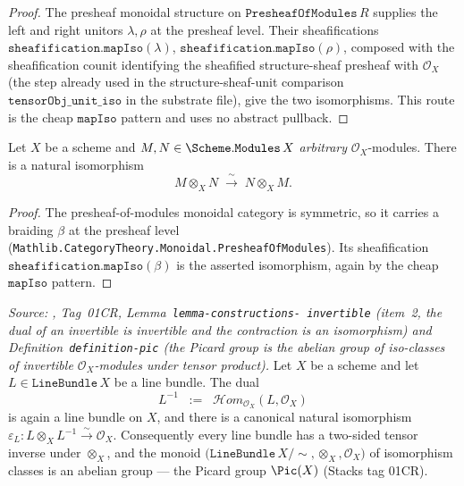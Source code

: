 \begin{proof}
  \leanok
  The presheaf monoidal structure on \(\mathtt{PresheafOfModules}\,R\) supplies
  the left and right unitors \(\lambda, \rho\) at the presheaf level. Their
  sheafifications \(\mathtt{sheafification.mapIso}(\lambda)\),
  \(\mathtt{sheafification.mapIso}(\rho)\), composed with the sheafification
  counit identifying the sheafified structure-sheaf presheaf with
  \(\mathcal{O}_X\) (the step already used in the structure-sheaf-unit
  comparison \(\mathtt{tensorObj\_unit\_iso}\) in the substrate file), give the
  two isomorphisms. This route is the cheap \(\mathtt{mapIso}\) pattern and uses no
  abstract pullback.
\end{proof}

\begin{lemma}\label{mk-lem:tensorobj_comm_iso}
  \leanok

  Let \(X\) be a scheme and \(M, N \in \Scheme.\mathtt{Modules}\,X\)
  \emph{arbitrary} \(\mathcal{O}_X\)-modules. There is a natural isomorphism
  \[
    M \otimes_X N \;\xrightarrow{\ \sim\ }\; N \otimes_X M .
  \]
\end{lemma}

\begin{proof}
  \leanok
  The presheaf-of-modules monoidal category is symmetric, so it carries a
  braiding \(\beta\) at the presheaf level
  (\texttt{Mathlib.CategoryTheory.Monoidal.PresheafOfModules}). Its
  sheafification \(\mathtt{sheafification.mapIso}(\beta)\) is the asserted
  isomorphism, again by the cheap \(\mathtt{mapIso}\) pattern.
\end{proof}

\begin{lemma}\label{mk-lem:tensorobj_inverse_invertible}

  \textit{Source: \cite{stacks-project}, Tag~01CR, Lemma~\texttt{lemma-constructions-%
  invertible} (item~2, the dual of an invertible is invertible and the contraction
  is an isomorphism) and Definition~\texttt{definition-pic} (the Picard group is
  the abelian group of iso-classes of invertible \(\mathcal{O}_X\)-modules under
  tensor product).}
  Let \(X\) be a scheme and let \(L \in \texttt{LineBundle}\,X\) be a line
  bundle. The dual
  \[
    L^{-1} \;\;:=\;\; \mathcal{H}om_{\mathcal{O}_X}(L, \mathcal{O}_X)
  \]
  is again a line bundle on \(X\), and there is a canonical natural
  isomorphism
  \(\varepsilon_L : L \otimes_X L^{-1} \xrightarrow{\sim} \mathcal{O}_X\).
  Consequently every line bundle has a two-sided tensor inverse under
  \(\otimes_X\), and the monoid \(\bigl(\texttt{LineBundle}\,X / \sim, \otimes_X,
  \mathcal{O}_X\bigr)\) of isomorphism classes is an abelian group ---
  the Picard group \(\Pic(X)\) (Stacks tag 01CR).
\end{lemma}

